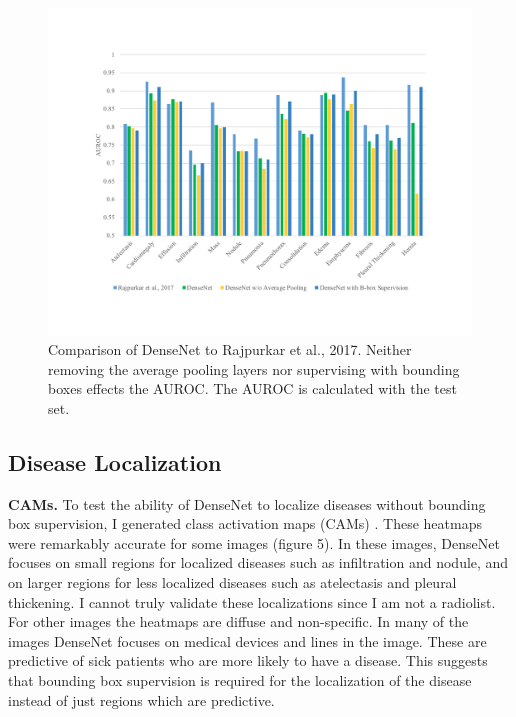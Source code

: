 \documentclass{article}
\begin{document}
\begin{figure}[p]
\vskip 0.2in
\begin{center}
\centerline{\includegraphics[width=\columnwidth]{figure_4}}
\caption{Comparison of DenseNet to Rajpurkar et al., 2017. Neither removing the average pooling layers nor supervising with bounding boxes effects the AUROC. The AUROC is calculated with the test set.}
\label{figure 4:}
\end{center}
\vskip -0.2in
\end{figure}

\subsection{Disease Localization}

{\bf CAMs.} To test the ability of DenseNet to localize diseases without bounding box supervision, I generated class activation maps (CAMs) \cite{Zhou}. These heatmaps were remarkably accurate for some images (figure 5). In these images, DenseNet focuses on small regions for localized diseases such as infiltration and nodule, and on larger regions for less localized diseases such as atelectasis and pleural thickening. I cannot truly validate these localizations since I am not a radiolist. For other images the heatmaps are diffuse and non-specific. In many of the images DenseNet focuses on medical devices and lines in the image. These are predictive of sick patients who are more likely to have a disease. This suggests that bounding box supervision is required for the localization of the disease instead of just regions which are predictive.
\end{document}
